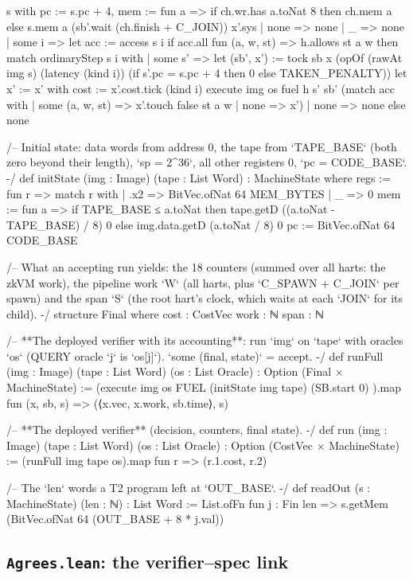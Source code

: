 \begin{leancode}[fontsize=\scriptsize,label={\footnotesize Contract/Machine.lean}]
            { s with pc := s.pc + 4, mem := fun a => if ch.wr.has a.toNat 8 then ch.mem a else s.mem a }
            (sb'.wait (ch.finish + C_JOIN)) x'.sys
        | none => none
      | _ => none
    | some i =>
      let acc := access s i
      if acc.all fun (a, w, st) => h.allows st a w then
        match ordinaryStep s i with
        | some s' =>
          let (sb', x') := tock sb x
            (opOf (rawAt img s) (latency (kind i)) (if s'.pc = s.pc + 4 then 0 else TAKEN_PENALTY))
          let x' := { x' with cost := x'.cost.tick (kind i) }
          execute img os fuel h s' sb' (match acc with | some (a, w, st) => x'.touch false st a w | none => x')
        | none => none
      else none

/-- Initial state: data words from address 0, the tape from `TAPE_BASE` (both zero beyond
their length), `sp = 2^36`, all other registers 0, `pc = CODE_BASE`. -/
def initState (img : Image) (tape : List Word) : MachineState where
  regs := fun r => match r with | .x2 => BitVec.ofNat 64 MEM_BYTES | _ => 0
  mem := fun a => if TAPE_BASE ≤ a.toNat then tape.getD ((a.toNat - TAPE_BASE) / 8) 0
    else img.data.getD (a.toNat / 8) 0
  pc := BitVec.ofNat 64 CODE_BASE

/-- What an accepting run yields: the 18 counters (summed over all harts: the zkVM work), the
pipeline work `W` (all harts, plus `C_SPAWN + C_JOIN` per spawn) and the span `S` (the root
hart's clock, which waits at each `JOIN` for its child). -/
structure Final where
  cost : CostVec
  work : ℕ
  span : ℕ

/-- **The deployed verifier with its accounting**: run `img` on `tape` with oracles `os`
(QUERY oracle `j` is `os[j]`). `some (final, state)` = accept. -/
def runFull (img : Image) (tape : List Word) (os : List Oracle) : Option (Final × MachineState) :=
  (execute img os FUEL {} (initState img tape) (SB.start 0) {}).map fun (x, sb, s) =>
    (⟨x.vec, x.work, sb.time⟩, s)

/-- **The deployed verifier** (decision, counters, final state). -/
def run (img : Image) (tape : List Word) (os : List Oracle) : Option (CostVec × MachineState) :=
  (runFull img tape os).map fun r => (r.1.cost, r.2)

/-- The `len` words a T2 program left at `OUT_BASE`. -/
def readOut (s : MachineState) (len : ℕ) : List Word :=
  List.ofFn fun j : Fin len => s.getMem (BitVec.ofNat 64 (OUT_BASE + 8 * j.val))
\end{leancode}

\subsection{\texttt{Agrees.lean}: the verifier--spec link}

